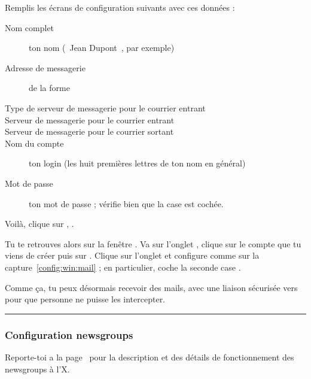 Remplis les \'ecrans de configuration suivants avec ces donn\'ees :
\begin{description}
  \item[Nom complet] ton nom (\guillemotleft~Jean Dupont~\guillemotright , par exemple)
  \item[Adresse de messagerie] de la forme 
  \item[Type de serveur de messagerie pour le courrier entrant] 
  \item[Serveur de messagerie pour le courrier entrant] 
  \item[Serveur de messagerie pour le courrier sortant] 
  \item[Nom du compte] ton login  (les huit premi\`eres lettres de ton nom en g\'en\'eral)
  \item[Mot de passe] ton mot de passe  ;
       v\'erifie bien que la case  est coch\'ee.
\end{description}

Voil\`a, clique sur , .

Tu te retrouves alors sur la fen\^etre . Va sur
l'onglet , clique sur le compte que tu viens de cr\'eer
puis sur . Clique sur l'onglet  et
configure comme sur la capture~\ref{config:win:mail} ; en
particulier, coche la seconde case .


Comme \c{c}a, tu peux d\'esormais recevoir des mails, avec une liaison
s\'ecuris\'ee vers  pour que personne ne puisse les
intercepter.

\setcounter{page}{31}

\noindent\rule{.4\textwidth}{.4pt}

 \vfill \pagebreak

\setcounter{page}{12}

\subsubsection{Configuration newsgroups}
Reporte-toi a la page~\pageref{newsgroups} pour la description et des d\'etails de fonctionnement des newsgroups \`a l'X.

